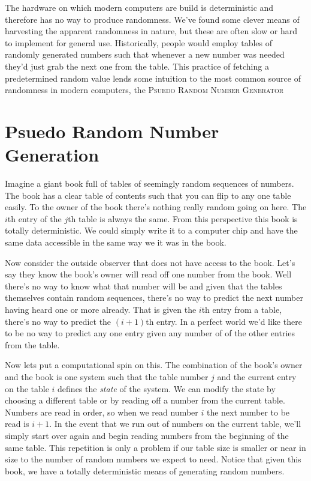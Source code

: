 \documentclass[]{tufte-handout}
\begin{document}
The hardware on which modern computers are build is deterministic and therefore has no way to produce randomness. We've found some clever means of harvesting the apparent randomness in nature, but these are often slow or hard to implement for general use. Historically, people would employ tables of randomly generated numbers such that whenever a new number was needed they'd just grab the next one from the table. This practice of fetching a predetermined random value lends some intuition to the most common source of randomness in modern computers, the \textsc{Psuedo Random Number Generator}


\section{Psuedo Random Number Generation}

Imagine a giant book full of tables of seemingly random sequences of numbers. The book has a clear table of contents such that you can flip to any one table easily. To the owner of the book there's nothing really random going on here. The $i$th entry of the $j$th table is always the same.  From this perspective this book is totally deterministic. We could simply write it to a computer chip and have the same data accessible in the same way we it was in the book. 

Now consider the outside observer that does not have access to the book. Let's say they know the book's owner will read off one number from the book. Well there's no way to know what that number will be and given that the tables themselves contain random sequences, there's no way to predict the next number having heard one or more already. That is given the $i$th entry from a table, there's no way to predict the $(i+1)$th entry.  In a perfect world we'd like there to be no way to predict any one entry given any number of of the other entries from the table. 

Now lets put a computational spin on this. The combination of the book's owner and the book is one system such that the table number $j$ and the current entry on the table $i$ defines the \textit{state} of the system. We can modify the state by choosing a different table or by reading off a number from the current table. Numbers are read in order, so when we read number $i$ the next number to be read is $i+1$. In the event that we run out of numbers on the current table, we'll simply start over again and begin reading numbers from the beginning of the same table. This repetition is only a problem if our table size is smaller or near in size to the number of random numbers we expect to need. Notice that given this book, we have a totally deterministic means of generating random numbers. 
\end{document}
